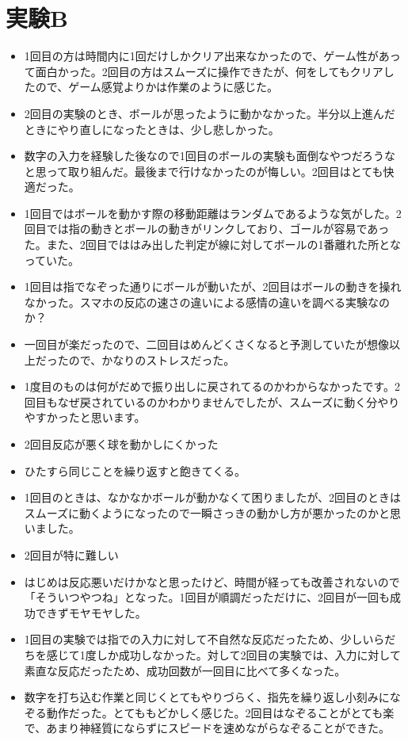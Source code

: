 \section{実験B}

\begin{itemize}
  \item 1回目の方は時間内に1回だけしかクリア出来なかったので、ゲーム性があって面白かった。2回目の方はスムーズに操作できたが、何をしてもクリアしたので、ゲーム感覚よりかは作業のように感じた。
  \item 2回目の実験のとき、ボールが思ったように動かなかった。半分以上進んだときにやり直しになったときは、少し悲しかった。
  \item 数字の入力を経験した後なので1回目のボールの実験も面倒なやつだろうなと思って取り組んだ。最後まで行けなかったのが悔しい。2回目はとても快適だった。
  \item 1回目ではボールを動かす際の移動距離はランダムであるような気がした。2回目では指の動きとボールの動きがリンクしており、ゴールが容易であった。また、2回目でははみ出した判定が線に対してボールの1番離れた所となっていた。
  \item 1回目は指でなぞった通りにボールが動いたが、2回目はボールの動きを操れなかった。スマホの反応の速さの違いによる感情の違いを調べる実験なのか？
  \item 一回目が楽だったので、二回目はめんどくさくなると予測していたが想像以上だったので、かなりのストレスだった。
  \item 1度目のものは何がだめで振り出しに戻されてるのかわからなかったです。2回目もなぜ戻されているのかわかりませんでしたが、スムーズに動く分やりやすかったと思います。
  \item 2回目反応が悪く球を動かしにくかった
  \item ひたすら同じことを繰り返すと飽きてくる。
  \item 1回目のときは、なかなかボールが動かなくて困りましたが、2回目のときはスムーズに動くようになったので一瞬さっきの動かし方が悪かったのかと思いました。
  \item 2回目が特に難しい
  \item はじめは反応悪いだけかなと思ったけど、時間が経っても改善されないので「そういつやつね」となった。1回目が順調だっただけに、2回目が一回も成功できずモヤモヤした。
  \item 1回目の実験では指での入力に対して不自然な反応だったため、少しいらだちを感じて1度しか成功しなかった。対して2回目の実験では、入力に対して素直な反応だったため、成功回数が一回目に比べて多くなった。
  \item 数字を打ち込む作業と同じくとてもやりづらく、指先を繰り返し小刻みになぞる動作だった。とてももどかしく感じた。2回目はなぞることがとても楽で、あまり神経質にならずにスピードを速めながらなぞることができた。

\end{itemize}
